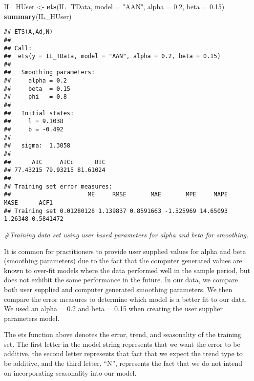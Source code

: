 \documentclass[
]{article}
\newenvironment{Shaded}{\begin{snugshade}}{\end{snugshade}}
\newcommand{\CommentTok}[1]{\textcolor[rgb]{0.56,0.35,0.01}{\textit{#1}}}
\newcommand{\DataTypeTok}[1]{\textcolor[rgb]{0.13,0.29,0.53}{#1}}
\newcommand{\FloatTok}[1]{\textcolor[rgb]{0.00,0.00,0.81}{#1}}
\newcommand{\KeywordTok}[1]{\textcolor[rgb]{0.13,0.29,0.53}{\textbf{#1}}}
\newcommand{\NormalTok}[1]{#1}
\newcommand{\StringTok}[1]{\textcolor[rgb]{0.31,0.60,0.02}{#1}}
\begin{document}
\begin{Shaded}
\begin{Highlighting}[]
\NormalTok{IL_HUser <-}\StringTok{ }\KeywordTok{ets}\NormalTok{(IL_TData, }\DataTypeTok{model =} \StringTok{"AAN"}\NormalTok{, }\DataTypeTok{alpha =} \FloatTok{0.2}\NormalTok{, }\DataTypeTok{beta =} \FloatTok{0.15}\NormalTok{)}
\KeywordTok{summary}\NormalTok{(IL_HUser)}
\end{Highlighting}
\end{Shaded}

\begin{verbatim}
## ETS(A,Ad,N) 
## 
## Call:
##  ets(y = IL_TData, model = "AAN", alpha = 0.2, beta = 0.15) 
## 
##   Smoothing parameters:
##     alpha = 0.2 
##     beta  = 0.15 
##     phi   = 0.8 
## 
##   Initial states:
##     l = 9.1038 
##     b = -0.492 
## 
##   sigma:  1.3058
## 
##      AIC     AICc      BIC 
## 77.43215 79.93215 81.61024 
## 
## Training set error measures:
##                      ME     RMSE       MAE       MPE     MAPE    MASE      ACF1
## Training set 0.01280128 1.139837 0.8591663 -1.525969 14.65093 1.26348 0.5841472
\end{verbatim}

\begin{Shaded}
\begin{Highlighting}[]
\CommentTok{#Training data set using user based parameters for alpha and beta for smoothing.}
\end{Highlighting}
\end{Shaded}

It is common for practitioners to provide user supplied values for alpha
and beta (smoothing parameters) due to the fact that the computer
generated values are known to over-fit models where the data performed
well in the sample period, but does not exhibit the same performance in
the future. In our data, we compare both user supplied and computer
generated smoothing parameters. We then compare the error measures to
determine which model is a better fit to our data. We used an alpha =
0.2 and beta = 0.15 when creating the user supplier parameters model.

The ets function above denotes the error, trend, and seasonality of the
training set. The first letter in the model string represents that we
want the error to be additive, the second letter represents that fact
that we expect the trend type to be additive, and the third letter,
``N'', represents the fact that we do not intend on incorporating
seasonality into our model.
\end{document}
